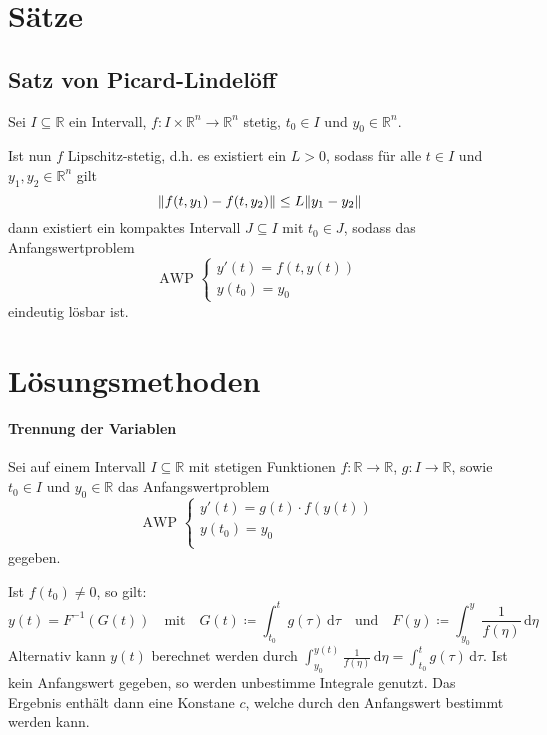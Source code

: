 \section{Sätze}
	\subsection{Satz von Picard-Lindelöff}
		Sei $ I \subseteq \mathbb{R} $ ein Intervall, $ f : I \times \mathbb{R} ^ n \rightarrow \mathbb{R} ^ n $ stetig, $ t _ 0 \in I $ und $ y _ 0 \in \mathbb{R} ^ n $.

		Ist nun $ f $ Lipschitz-stetig, d.h. es existiert ein $ L > 0 $, sodass für alle $ t \in I $ und $ y _ 1, y _ 2 \in \mathbb{R} ^ n $ gilt \[ \norm{f(t, y _ 1) - f(t, y _ 2)} \leq L\norm{y _ 1 - y _ 2} \] dann existiert ein kompaktes Intervall $ J \subseteq I $ mit $ t _ 0 \in J $, sodass das Anfangswertproblem
		\begin{equation*}
			\text{AWP }
			\begin{cases}
				y'(t) = f(t, y(t)) \\
				y(t _ 0) = y _ 0
			\end{cases}
		\end{equation*}
		eindeutig lösbar ist.

\section{Lösungsmethoden}
	\paragraph{Trennung der Variablen}
		Sei auf einem Intervall $ I \subseteq \mathbb{R} $ mit stetigen Funktionen $ f : \mathbb{R} \rightarrow \mathbb{R} $, $ g : I \rightarrow \mathbb{R} $, sowie $ t _ 0 \in I $ und $ y _ 0 \in \mathbb{R} $ das Anfangswertproblem
		\begin{equation*}
			\text{AWP }
			\begin{cases}
				y'(t) = g(t) \cdot f(y(t)) \\
				y(t _ 0) = y _ 0           \\
			\end{cases}
		\end{equation*}
		gegeben.

		Ist $ f(t _ 0) \neq 0 $, so gilt:
		\begin{equation*}
			y(t) = F ^ { -1 } (G(t)) \quad\text{mit}\quad G(t) \coloneqq \int _ { t _ 0 } ^ t \! g(\tau) \, \mathrm{d}\tau \quad\text{und}\quad F(y) \coloneqq \int _ { y _ 0 } ^ y \! \frac{1}{f(\eta)} \, \mathrm{d}\eta
		\end{equation*}
		Alternativ kann $ y(t) $ berechnet werden durch $ \int _ { y _ 0 } ^ { y(t) } \! \frac{1}{f(\eta)} \, \mathrm{d}\eta = \int _ { t _ 0 } ^ { t } \! g(\tau) \, \mathrm{d}\tau $. Ist kein Anfangswert gegeben, so werden unbestimme Integrale genutzt. Das Ergebnis enthält dann eine Konstane $ c $, welche durch den Anfangswert bestimmt werden kann.

